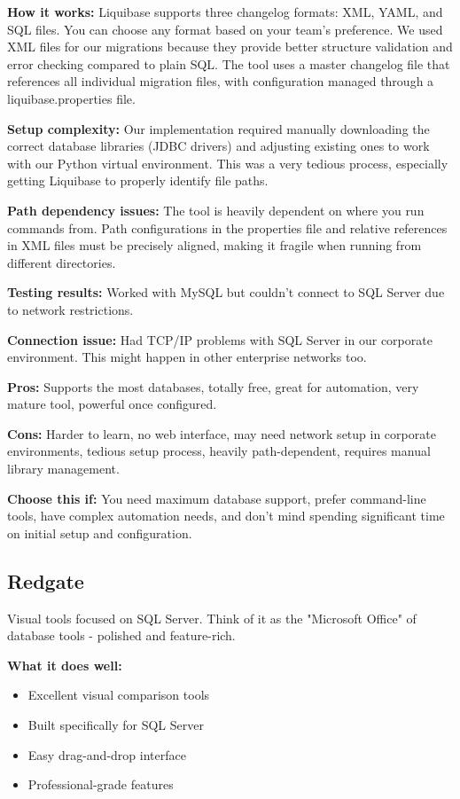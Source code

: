 \documentclass[11pt,a4paper]{article}
\begin{document}
\textbf{How it works:} Liquibase supports three changelog formats: XML, YAML, and SQL files. You can choose any format based on your team's preference. We used XML files for our migrations because they provide better structure validation and error checking compared to plain SQL. The tool uses a master changelog file that references all individual migration files, with configuration managed through a liquibase.properties file.

\textbf{Setup complexity:} Our implementation required manually downloading the correct database libraries (JDBC drivers) and adjusting existing ones to work with our Python virtual environment. This was a very tedious process, especially getting Liquibase to properly identify file paths.

\textbf{Path dependency issues:} The tool is heavily dependent on where you run commands from. Path configurations in the properties file and relative references in XML files must be precisely aligned, making it fragile when running from different directories.

\textbf{Testing results:} Worked with MySQL but couldn't connect to SQL Server due to network restrictions.

\textbf{Connection issue:} Had TCP/IP problems with SQL Server in our corporate environment. This might happen in other enterprise networks too.

\textbf{Pros:} Supports the most databases, totally free, great for automation, very mature tool, powerful once configured.

\textbf{Cons:} Harder to learn, no web interface, may need network setup in corporate environments, tedious setup process, heavily path-dependent, requires manual library management.

\textbf{Choose this if:} You need maximum database support, prefer command-line tools, have complex automation needs, and don't mind spending significant time on initial setup and configuration.

\subsection{Redgate}

Visual tools focused on SQL Server. Think of it as the "Microsoft Office" of database tools - polished and feature-rich.

\textbf{What it does well:}
\begin{itemize}
    \item Excellent visual comparison tools
    \item Built specifically for SQL Server
    \item Easy drag-and-drop interface
    \item Professional-grade features
\end{itemize}
\end{document}

